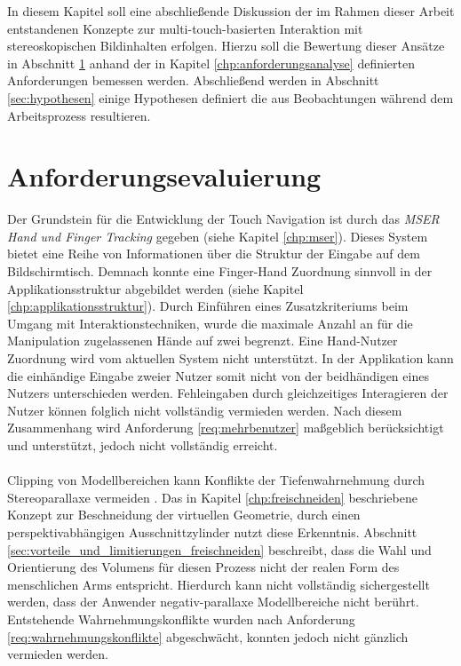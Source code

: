In diesem Kapitel soll eine abschließende Diskussion der im Rahmen dieser Arbeit entstandenen Konzepte zur multi-touch-basierten Interaktion mit stereoskopischen Bildinhalten erfolgen. Hierzu soll die Bewertung dieser Ansätze in Abschnitt \ref{sec:anforderungsevaluierung} anhand der in Kapitel \ref{chp:anforderungsanalyse} definierten Anforderungen bemessen werden. Abschließend werden in Abschnitt \ref{sec:hypothesen} einige Hypothesen definiert die aus Beobachtungen während dem Arbeitsprozess resultieren.


\section{Anforderungsevaluierung}
\label{sec:anforderungsevaluierung}

Der Grundstein für die Entwicklung der Touch Navigation ist durch das \emph{MSER Hand und Finger Tracking} gegeben (siehe Kapitel \ref{chp:mser}). Dieses System bietet eine Reihe von Informationen über die Struktur der Eingabe auf dem Bildschirmtisch. Demnach konnte eine Finger-Hand Zuordnung sinnvoll in der Applikationsstruktur abgebildet werden (siehe Kapitel \ref{chp:applikationsstruktur}). Durch Einführen eines Zusatzkriteriums beim Umgang mit Interaktionstechniken, wurde die maximale Anzahl an für die Manipulation zugelassenen Hände auf zwei begrenzt. Eine Hand-Nutzer Zuordnung wird vom aktuellen System nicht unterstützt. In der Applikation kann die einhändige Eingabe zweier Nutzer somit nicht von der beidhändigen eines Nutzers unterschieden werden. Fehleingaben durch gleichzeitiges Interagieren der Nutzer können folglich nicht vollständig vermieden werden. Nach diesem Zusammenhang wird Anforderung \ref{req:mehrbenutzer} maßgeblich berücksichtigt und unterstützt, jedoch nicht vollständig erreicht.
\\\\
Clipping von Modellbereichen kann Konflikte der Tiefenwahrnehmung durch Stereoparallaxe vermeiden \cite{ardouin:2011}. Das in Kapitel \ref{chp:freischneiden} beschriebene Konzept zur Beschneidung der virtuellen Geometrie, durch einen perspektivabhängigen Ausschnittzylinder nutzt diese Erkenntnis. Abschnitt \ref{sec:vorteile_und_limitierungen_freischneiden} beschreibt, dass die Wahl und Orientierung des Volumens für diesen Prozess nicht der realen Form des menschlichen Arms entspricht. Hierdurch kann nicht vollständig sichergestellt werden, dass der Anwender negativ-parallaxe Modellbereiche nicht berührt. Entstehende Wahrnehmungskonflikte wurden nach Anforderung \ref{req:wahrnehmungskonflikte} abgeschwächt, konnten jedoch nicht gänzlich vermieden werden.
